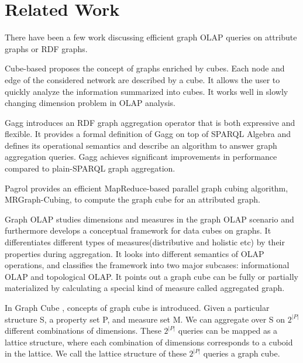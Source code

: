 \section{Related Work}

There have been a few work discussing efficient graph OLAP queries on attribute graphs or RDF graphs. 

Cube-based \cite{DBLP:conf/sofsem/JakawatFL16} proposes the concept of  graphs enriched by cubes. Each node and edge of the considered network are described by a cube. It allows the user to quickly analyze the information summarized into cubes. It works well in slowly changing dimension problem in OLAP analysis. 

Gagg \cite{DBLP:conf/esws/MaaliCD15} introduces an RDF graph aggregation operator that is both expressive and flexible. It provides a formal definition of Gagg on top of SPARQL Algebra and defines its operational semantics and describe an algorithm to answer graph aggregation queries. Gagg achieves significant improvements in performance compared to plain-SPARQL graph aggregation.

Pagrol \cite{DBLP:conf/icde/WangFWTAA14} provides an efficient MapReduce-based parallel graph cubing algorithm, MRGraph-Cubing, to compute the graph cube for an attributed graph.


Graph OLAP \cite{DBLP:conf/icdm/ChenYZHY08} studies dimensions and measures in the graph OLAP scenario and furthermore develops a conceptual framework for data cubes on graphs. It differentiates different types of measures(distributive and holistic etc) by their properties during aggregation. It looks into different semantics of OLAP operations, and classifies the framework into two major subcases: informational OLAP and topological OLAP. It points out a graph cube can be fully or partially materialized by calculating a special kind of measure called aggregated graph.

In Graph Cube \cite{DBLP:conf/sigmod/ZhaoLXH11}, concepts of graph cube is introduced. Given a particular structure S, a property set P, and measure set M. We can aggregate over S on $2^{|P|}$ different combinations of dimensions. These $2^{|P|}$ queries can be mapped as a lattice structure, where each combination of dimensions corresponds to a cuboid in the lattice. We call the lattice structure of these $2^{|P|}$ queries a graph cube.


